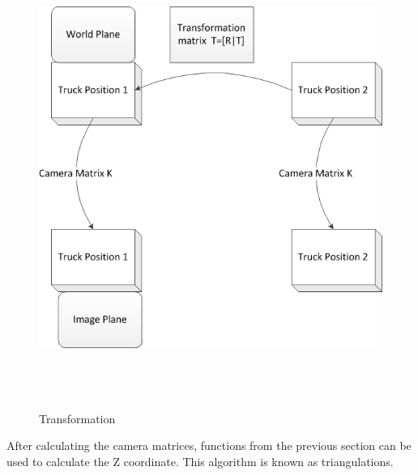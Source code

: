 \begin{figure}[h]
    \centering
    \includegraphics[width=15cm,height=15cm,keepaspectratio]{Pictures/Truck}
    \caption{Transformation}
    \label{fig:truck}
  \end{figure}

After calculating the camera matrices, functions from the previous section can be used to calculate the Z coordinate. This algorithm is known as triangulations.
